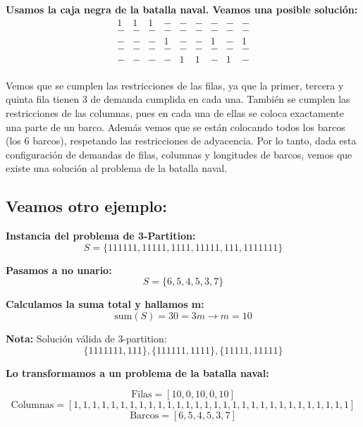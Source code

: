 \textbf{Usamos la caja negra de la batalla naval. Veamos una posible solución:}
\[
\begin{array}{ccccccccc}
1 & 1 & 1 & - & - & - & - & - & - \\
- & - & - & - & - & - & - & - & - \\
- & - & - & 1 & - & - & 1 & - & 1 \\
- & - & - & - & - & - & - & - & - \\
- & - & - & - & 1 & 1 & - & 1 & - \\
\end{array}
\]

Vemos que se cumplen las restricciones de las filas, ya que la primer, tercera y quinta fila tienen 3 de demanda cumplida en cada una.
También se cumplen las restricciones de las columnas, pues en cada una de ellas se coloca exactamente una parte de un barco.
Además vemos que se están colocando todos los barcos (los 6 barcos), respetando las restricciones de adyacencia.
Por lo tanto, dada esta configuración de demandas de filas, columnas y longitudes de barcos, vemos que existe una solución al problema de la batalla naval.


\subsection{Veamos otro ejemplo:}

\textbf{Instancia del problema de 3-Partition:}
\[
S = \{111111, 11111, 1111, 11111, 111, 1111111\}
\]

\textbf{Pasamos a no unario:}
\[
S = \{6, 5, 4, 5, 3, 7\}
\]

\textbf{Calculamos la suma total y hallamos m:}
\[
\text{sum}(S) = 30 = 3m \rightarrow m = 10
\]

\textbf{Nota:} Solución válida de 3-partition:
\[
    \{1111111, 111\}, \{111111, 1111\}, \{11111, 11111\}
\]

\textbf{Lo transformamos a un problema de la batalla naval:}

\[
\text{Filas} = [10, 0, 10, 0, 10]
\]
\[
\text{Columnas} = [1, 1, 1, 1, 1, 1, 1, 1, 1, 1, 1, 1, 1, 1, 1, 1, 1, 1, 1, 1, 1, 1, 1, 1, 1, 1, 1, 1, 1, 1]
\]
\[
\text{Barcos} = [6, 5, 4, 5, 3, 7]
\]

